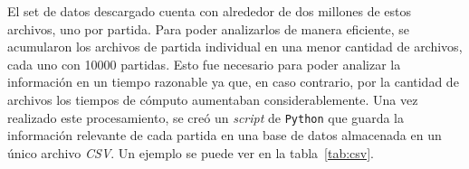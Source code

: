 \documentclass[11pt,twoside,spanish]{report} %
\begin{document}
El set de datos descargado cuenta con alrededor de dos millones de estos archivos, uno por partida.
Para poder analizarlos de manera eficiente, se acumularon los archivos de partida individual en una menor cantidad de archivos, cada uno con \num{10000} partidas.
Esto fue necesario para poder analizar la informaci\'on en un tiempo razonable ya que, en caso contrario, por la cantidad de archivos los tiempos de c\'omputo aumentaban considerablemente.
Una vez realizado este procesamiento, se cre\'o un \textit{script} de \texttt{Python} que guarda la informaci\'on relevante de cada partida en una base de datos almacenada en un \'unico archivo \textit{CSV}.
Un ejemplo se puede ver en la tabla~\ref{tab:csv}.

\begin{table}[H]
	\centering
	\caption{Ejemplo de informaci\'on de partidas obtenidas desde el servicio en l\'inea KGS.}
	\label{tab:csv}
\end{table}
\end{document}
